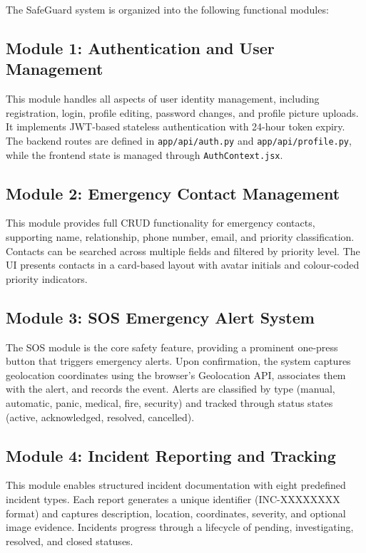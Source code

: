 The SafeGuard system is organized into the following functional modules:

\subsection{Module 1: Authentication and User Management}

This module handles all aspects of user identity management, including registration, login, profile editing, password changes, and profile picture uploads. It implements JWT-based stateless authentication with 24-hour token expiry. The backend routes are defined in \texttt{app/api/auth.py} and \texttt{app/api/profile.py}, while the frontend state is managed through \texttt{AuthContext.jsx}.

\subsection{Module 2: Emergency Contact Management}

This module provides full CRUD functionality for emergency contacts, supporting name, relationship, phone number, email, and priority classification. Contacts can be searched across multiple fields and filtered by priority level. The UI presents contacts in a card-based layout with avatar initials and colour-coded priority indicators.

\subsection{Module 3: SOS Emergency Alert System}

The SOS module is the core safety feature, providing a prominent one-press button that triggers emergency alerts. Upon confirmation, the system captures geolocation coordinates using the browser's Geolocation API, associates them with the alert, and records the event. Alerts are classified by type (manual, automatic, panic, medical, fire, security) and tracked through status states (active, acknowledged, resolved, cancelled).

\subsection{Module 4: Incident Reporting and Tracking}

This module enables structured incident documentation with eight predefined incident types. Each report generates a unique identifier (INC-XXXXXXXX format) and captures description, location, coordinates, severity, and optional image evidence. Incidents progress through a lifecycle of pending, investigating, resolved, and closed statuses.

